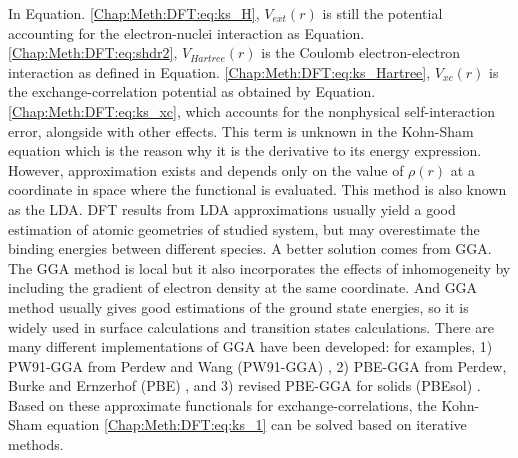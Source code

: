 In Equation. \ref{Chap:Meth:DFT:eq:ks_H}, $V_{ext}(r)$ is still the potential accounting for the electron-nuclei interaction as Equation. \ref{Chap:Meth:DFT:eq:shdr2}, $V_{Hartree}(r)$ is the Coulomb electron-electron interaction as defined in Equation. \ref{Chap:Meth:DFT:eq:ks_Hartree}, $V_{xc}(r)$ is the exchange-correlation potential as obtained by Equation. \ref{Chap:Meth:DFT:eq:ks_xc}, which accounts for the nonphysical self-interaction error, alongside with other effects. This term is unknown in the Kohn-Sham equation which is the reason why it is the derivative to its energy expression. However, approximation exists and depends only on the value of $\rho(r)$ at a coordinate in space where the functional is evaluated. This method is also known as the \acf{LDA}. \cite{perdew1981self} DFT results from \ac{LDA} approximations usually yield a good estimation of atomic geometries of studied system, but may overestimate the binding energies between different species. A better solution comes from \acf{GGA}. \cite{perdew1986density} The \ac{GGA} method is local but it also incorporates the effects of inhomogeneity by including the gradient of electron density at the same coordinate. \cite{ceperley1980ground} And \ac{GGA} method usually gives good estimations of the ground state energies, so it is widely used in surface calculations and transition states calculations. There are many different implementations of GGA have been developed: for examples, 1) PW91-GGA from Perdew and Wang (PW91-GGA) \cite{perdew1992accurate}, 2) PBE-GGA from Perdew, Burke and Ernzerhof (PBE) \cite{perdew1996generalized}, and 3) revised PBE-GGA for solids (PBEsol) \cite{perdew2008restoring}. Based on these approximate functionals for exchange-correlations, the Kohn-Sham equation \ref{Chap:Meth:DFT:eq:ks_1} can be solved based on iterative methods.